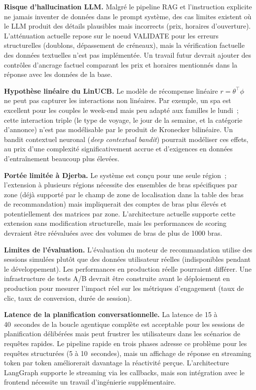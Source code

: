 \textbf{Risque d'hallucination LLM.} Malgré le pipeline RAG et l'instruction explicite
\og{}ne jamais inventer de données\fg{} dans le prompt système, des cas limites existent
où le LLM produit des détails plausibles mais incorrects (prix, horaires d'ouverture).
L'atténuation actuelle repose sur le noeud VALIDATE pour les erreurs structurelles
(doublons, dépassement de créneaux), mais la vérification factuelle des données textuelles
n'est pas implémentée. Un travail futur devrait ajouter des contrôles d'ancrage factuel
comparant les prix et horaires mentionnés dans la réponse avec les données de la base.

\textbf{Hypothèse linéaire du LinUCB.} Le modèle de récompense linéaire
$r = \theta^\top \phi$ ne peut pas capturer les interactions non linéaires. Par exemple,
un spa est excellent pour les couples le week-end mais peu adapté aux familles le lundi~;
cette interaction triple (le type de voyage, le jour de la semaine, et la catégorie d'annonce) n'est pas
modélisable par le produit de Kronecker bilinéaire. Un bandit contextuel neuronal
(\textit{deep contextual bandit}) pourrait modéliser ces effets, au prix d'une complexité
significativement accrue et d'exigences en données d'entraînement beaucoup plus élevées.

\textbf{Portée limitée à Djerba.} Le système est conçu pour une seule région~; l'extension
à plusieurs régions nécessite des ensembles de bras spécifiques par zone (déjà supporté par
le champ de zone de localisation dans la table des bras de recommandation) mais impliquerait des comptes
de bras plus élevés et potentiellement des matrices par zone. L'architecture actuelle
supporte cette extension sans modification structurelle, mais les performances de scoring
devraient être réévaluées avec des volumes de bras de plus de 1000 bras.

\textbf{Limites de l'évaluation.} L'évaluation du moteur de recommandation utilise des
sessions simulées plutôt que des données utilisateur réelles (indisponibles pendant le
développement). Les performances en production réelle pourraient différer. Une
infrastructure de tests A/B devrait être construite avant le déploiement en production
pour mesurer l'impact réel sur les métriques d'engagement (taux de clic, taux de
conversion, durée de session).

\textbf{Latence de la planification conversationnelle.} La latence de 15 à 40~secondes de
la boucle agentique complète est acceptable pour les sessions de planification délibérées
mais peut frustrer les utilisateurs dans les scénarios de requêtes rapides. Le pipeline
rapide en trois phases adresse ce problème pour les requêtes structurées (5 à 10~secondes),
mais un affichage de réponse en streaming token par token améliorerait davantage la
réactivité perçue. L'architecture LangGraph supporte le streaming via les callbacks, mais
son intégration avec le frontend nécessite un travail d'ingénierie supplémentaire.


